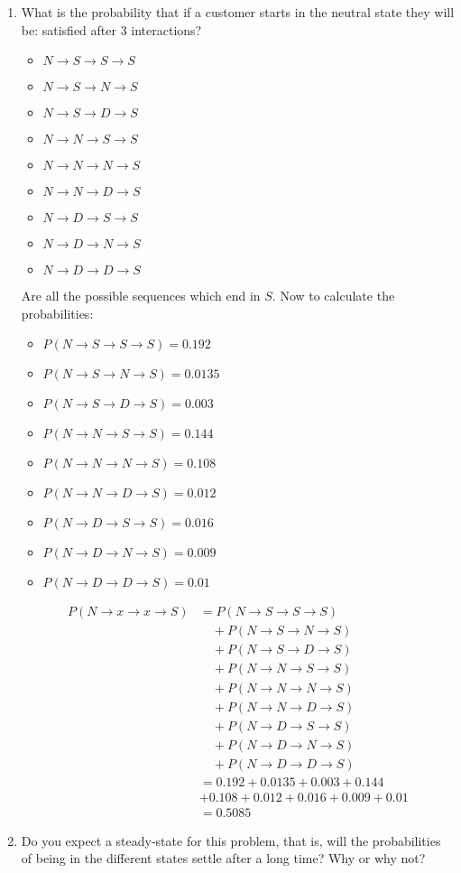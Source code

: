 \documentclass{article}
\begin{document}
\begin{enumerate}[label=(\alph*)]
    \item What is the probability that if a customer starts in the neutral state they will be: satisfied after 3 interactions?\begin{itemize}
        \item $N\to S\to S\to S$
        \item $N\to S\to N\to S$
        \item $N\to S\to D\to S$
        \item $N\to N\to S\to S$
        \item $N\to N\to N\to S$
        \item $N\to N\to D\to S$
        \item $N\to D\to S\to S$
        \item $N\to D\to N\to S$
        \item $N\to D\to D\to S$
    \end{itemize}
    Are all the possible sequences which end in $S$. Now to calculate the probabilities:\begin{itemize}
        \item $P(N\to S\to S\to S)=0.192$
        \item $P(N\to S\to N\to S)=0.0135$
        \item $P(N\to S\to D\to S)=0.003$
        \item $P(N\to N\to S\to S)=0.144$
        \item $P(N\to N\to N\to S)=0.108$
        \item $P(N\to N\to D\to S)=0.012$
        \item $P(N\to D\to S\to S)=0.016$
        \item $P(N\to D\to N\to S)=0.009$
        \item $P(N\to D\to D\to S)=0.01$
    \end{itemize}
    \begin{align*}
    P(N\to x\to x\to S) &= P(N\to S\to S\to S) \\
    &\quad + P(N\to S\to N\to S) \\
    &\quad + P(N\to S\to D\to S) \\
    &\quad + P(N\to N\to S\to S) \\
    &\quad + P(N\to N\to N\to S) \\
    &\quad + P(N\to N\to D\to S) \\
    &\quad + P(N\to D\to S\to S) \\
    &\quad + P(N\to D\to N\to S) \\
    &\quad + P(N\to D\to D\to S) \\
    &= 0.192 + 0.0135 + 0.003 + 0.144 \\
    & + 0.108 + 0.012 + 0.016 + 0.009 + 0.01 \\
    &= 0.5085
    \end{align*}
\item Do you expect a steady-state for this problem, that is, will the probabilities of being in the different states settle after a long time? Why or why not?
\end{enumerate}
\end{document}
